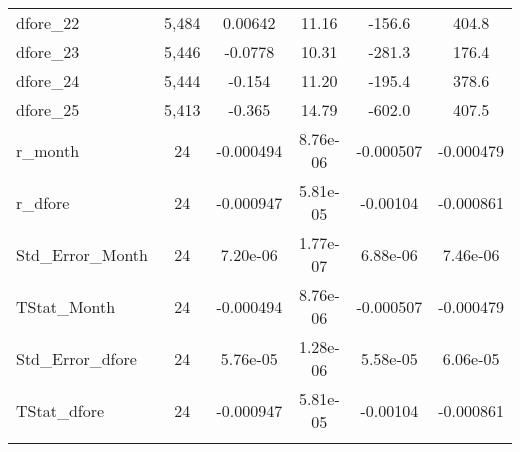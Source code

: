 \begin{tabular}{lccccc}
dfore\_22 & 5,484 & 0.00642 & 11.16 & -156.6 & 404.8 \\
dfore\_23 & 5,446 & -0.0778 & 10.31 & -281.3 & 176.4 \\
dfore\_24 & 5,444 & -0.154 & 11.20 & -195.4 & 378.6 \\
dfore\_25 & 5,413 & -0.365 & 14.79 & -602.0 & 407.5 \\
r\_month & 24 & -0.000494 & 8.76e-06 & -0.000507 & -0.000479 \\
r\_dfore & 24 & -0.000947 & 5.81e-05 & -0.00104 & -0.000861 \\
Std\_Error\_Month & 24 & 7.20e-06 & 1.77e-07 & 6.88e-06 & 7.46e-06 \\
TStat\_Month & 24 & -0.000494 & 8.76e-06 & -0.000507 & -0.000479 \\
Std\_Error\_dfore & 24 & 5.76e-05 & 1.28e-06 & 5.58e-05 & 6.06e-05 \\
TStat\_dfore & 24 & -0.000947 & 5.81e-05 & -0.00104 & -0.000861 \\
 &  &  &  &  &  \\ \hline
\end{tabular}
